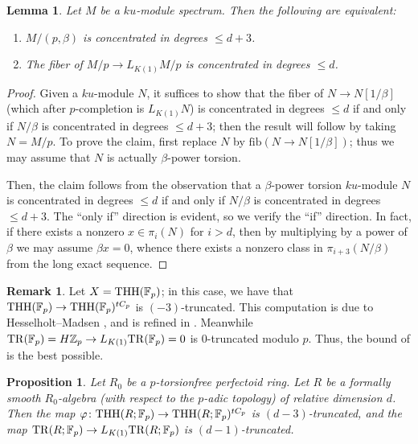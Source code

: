 \documentclass{amsart}
\newtheorem{lemma}[theorem]{Lemma}
\newtheorem{proposition}[theorem]{Proposition}
\theoremstyle{definition}
\newtheorem{remark}[theorem]{Remark}
\begin{document}
\begin{lemma} 
\label{K1locallemma}
Let $M$ be a $ku$-module spectrum. 
Then the following are equivalent: 
\begin{enumerate}
\item  
$M/(p, \beta)$ is concentrated in degrees $\leq d + 3$. 

\item

The fiber of $M/p \to L_{K(1)} M/p$ is concentrated in degrees $\leq d$. 
\end{enumerate}
\end{lemma} 
\begin{proof} 
Given a $ku$-module $N$, it suffices to show that the fiber of $N \to 
N[1/\beta]$ (which after $p$-completion is $L_{K(1)} N$) is
concentrated in degrees $\leq d$ if and only if $N/\beta$ is concentrated in
degrees $\leq d+3$; then the result will follow by taking $N = M/p$.
To prove the claim, first 
replace $N$ by $\mathrm{fib}( N \to N[1/\beta])$; thus we may assume that $N$ is
actually $\beta$-power torsion. 

Then, the claim follows from the observation that a $\beta$-power torsion
$ku$-module $N$
is concentrated in degrees $\leq d$ if and only if $N/\beta$ is concentrated in
degrees $\leq d+3$. The ``only if'' direction is evident, so we verify the
``if'' direction. 
In fact, if there exists a nonzero $x \in \pi_i(N)$ for $i > d$, then 
by multiplying by a power of $\beta$ we may assume $\beta x = 0$, whence
there exists a nonzero class in $\pi_{i+3}(N/\beta)$ from the long exact
sequence. 
\end{proof} 


\begin{remark} 
Let $X = \mathrm{THH}(\mathbb{F}_p)$; in this case, we have that $\mathrm{THH}(\mathbb{F}_p) \to
\mathrm{THH}(\mathbb{F}_p)^{tC_p}$ is $(-3)$-truncated. 
This computation is due to Hesselholt--Madsen \cite[Sec.~5]{HM97}, and is
refined in \cite[App.~IV-4]{NS18}. 
Meanwhile $\mathrm{TR}(\mathbb{F}_p) =
H\mathbb{Z}_p\to
L_{K(1)} \mathrm{TR}(\mathbb{F}_p)
= 0$ is $0$-truncated modulo $p$. 
Thus, the bound of  is the best possible. 
\end{remark} 




\begin{proposition} 
\label{perfectoidtrunc}
Let $R_0$ be a $p$-torsionfree perfectoid ring. 
Let $R$ be a formally smooth $R_0$-algebra
(with respect to the $p$-adic topology) of relative dimension $d$. 
Then 
the map $\varphi \colon \mathrm{THH}(R; \mathbb{F}_p) \to \mathrm{THH}(R; \mathbb{F}_p)^{tC_p}$
is $(d-3)$-truncated, and  
the map $\mathrm{TR}(R; \mathbb{F}_p) \to L_{K(1)} \mathrm{TR}(R; \mathbb{F}_p)$
is $(d-1)$-truncated. 
\end{proposition} 
\end{document}
